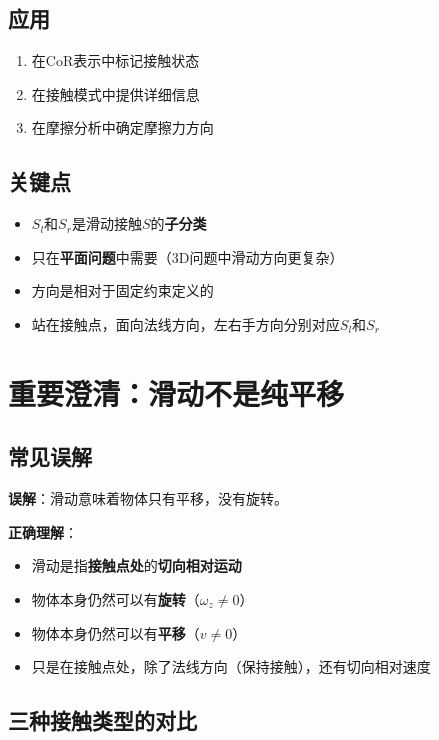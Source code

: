 \documentclass[12pt,a4paper]{article}
\begin{document}
\subsection{应用}

\begin{enumerate}
\item 在CoR表示中标记接触状态
\item 在接触模式中提供详细信息
\item 在摩擦分析中确定摩擦力方向
\end{enumerate}

\subsection{关键点}

\begin{itemize}
\item $S_l$和$S_r$是滑动接触$S$的\textbf{子分类}
\item 只在\textbf{平面问题}中需要（3D问题中滑动方向更复杂）
\item 方向是相对于固定约束定义的
\item 站在接触点，面向法线方向，左右手方向分别对应$S_l$和$S_r$
\end{itemize}

\section{重要澄清：滑动不是纯平移}

\subsection{常见误解}

\textbf{误解}：滑动意味着物体只有平移，没有旋转。

\textbf{正确理解}：
\begin{itemize}
\item 滑动是指\textbf{接触点处}的\textbf{切向相对运动}
\item 物体本身仍然可以有\textbf{旋转}（$\omega_z \neq 0$）
\item 物体本身仍然可以有\textbf{平移}（$v \neq 0$）
\item 只是在接触点处，除了法线方向（保持接触），还有切向相对速度
\end{itemize}

\subsection{三种接触类型的对比}
\end{document}
